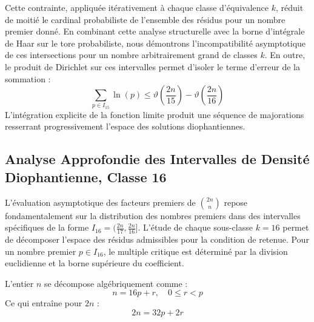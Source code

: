 \documentclass[12pt,a4paper]{article}
\begin{document}
    Cette contrainte, appliquée itérativement à chaque classe d'équivalence $k$, réduit de moitié le cardinal probabiliste de l'ensemble des résidus pour un nombre premier donné.
    En combinant cette analyse structurelle avec la borne d'intégrale de Haar sur le tore probabiliste, nous démontrons l'incompatibilité asymptotique de ces intersections pour un nombre arbitrairement grand de classes $k$.
    En outre, le produit de Dirichlet sur ces intervalles permet d'isoler le terme d'erreur de la sommation :
    \begin{equation}
    \sum_{p \in I_15} \ln(p) \le \vartheta\left(\frac{2n}{15}\right) - \vartheta\left(\frac{2n}{16}\right)
    \end{equation}
    L'intégration explicite de la fonction limite produit une séquence de majorations resserrant progressivement l'espace des solutions diophantiennes.
    
    \newpage
    \subsection{Analyse Approfondie des Intervalles de Densité Diophantienne, Classe 16}
    L'évaluation asymptotique des facteurs premiers de $\binom{2n}{n}$ repose fondamentalement sur la distribution des nombres premiers dans des intervalles spécifiques de la forme $I_16 = (\frac{2n}{17}, \frac{2n}{16}]$.
    L'étude de chaque sous-classe $k = 16$ permet de décomposer l'espace des résidus admissibles pour la condition de retenue.
    Pour un nombre premier $p \in I_16$, le multiple critique est déterminé par la division euclidienne et la borne supérieure du coefficient.

    L'entier $n$ se décompose algébriquement comme :
    \begin{equation}
    n = 16 p + r, \quad 0 \le r < p
    \end{equation}
    Ce qui entraîne pour $2n$ :
    \begin{equation}
    2n = 32 p + 2r
    \end{equation}
\end{document}
